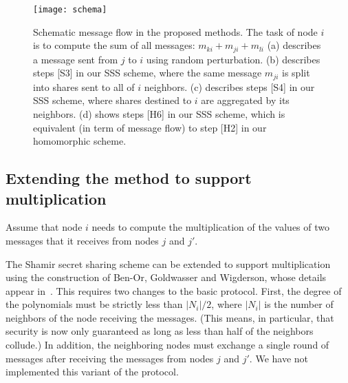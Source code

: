 \documentclass[10pt]{svjour3}
\begin{document}


\begin{figure}
\texttt{[image: schema]}\\
  \caption{Schematic message flow in the proposed methods. The task of node $i$ is to compute the sum of all messages: $m_{ki} + m_{ji} + m_{li}$ (a) describes a message sent from $j$ to $i$ using random perturbation.
  (b) describes steps [S3] in our SSS scheme, where the same message $m_{ji}$ is split into shares sent to all of $i$ neighbors.
  (c) describes steps [S4] in our SSS scheme, where shares destined to $i$ are aggregated by its neighbors. (d) shows steps [H6] in our SSS scheme,
    which is equivalent (in term of message flow) to step [H2] in our homomorphic scheme. }\label{dimes}
\end{figure}

\subsection{Extending the method to support multiplication}

Assume  that node $i$ needs to compute the multiplication of the
values of  two messages that it receives from nodes $j$ and $j'$.
 The Shamir secret sharing scheme
can be extended to support multiplication using the construction
of Ben-Or, Goldwasser and Wigderson, whose details appear
in~\cite{BGW}. This requires two changes to the basic protocol.
First, the degree of the polynomials must be strictly less than
$|N_i|/2$, where $|N_i|$ is the number of neighbors of the node receiving
the messages. (This means, in particular, that security is now
only guaranteed as long as less than half of the neighbors
collude.) In addition, the neighboring nodes must exchange a
single round of messages after receiving the messages from nodes
$j$ and $j'$.
We have not implemented this variant of the protocol.
\end{document}
